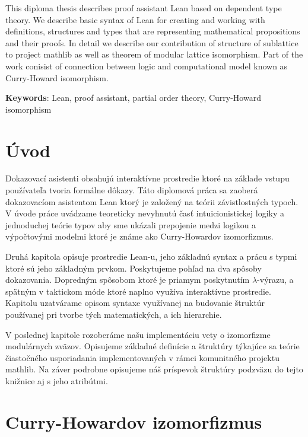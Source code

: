 \documentclass[a4paper,10pt,oneside]{report}%
\begin{document}
    This diploma thesis describes proof assistant Lean based on dependent type theory.
    We describe basic syntax of Lean for creating and working with definitions, structures and
types that are representing mathematical propositions and their proofs.
    In detail we describe our contribution of structure of sublattice to project mathlib
as well as theorem of modular lattice isomorphism.
    Part of the work conisist of connection between logic and computational model
known as Curry-Howard isomorphism.
    
    \textbf{Keywords}: Lean, proof assistant, partial order theory, Curry-Howard isomorphism

\newpage

\tableofcontents

\newpage

\chapter{Úvod}
    Dokazovací asistenti obsahujú interaktívne prostredie ktoré na základe vstupu
používateľa tvoria formálne dôkazy.
    Táto diplomová práca sa zaoberá dokazovacíom asistentom Lean ktorý je
založený na teórii závistlostných typoch.
    V úvode práce uvádzame teoreticky nevyhnutú časť intuicionistickej logiky
a jednoduchej teórie typov aby sme ukázali prepojenie medzi logikou a výpočtovými
modelmi ktoré je známe ako Curry-Howardov izomorfizmus.

    Druhá kapitola opisuje prostredie Lean-u, jeho základnú syntax a prácu s 
typmi ktoré sú jeho základným prvkom.
    Poskytujeme pohľad na dva spôsoby dokazovania. Dopredným spôsobom ktoré je priamym
poskytnutím $\lambda$-výrazu, a spätným v taktickom móde ktoré naplno využíva interaktívne prostredie.
    Kapitolu uzatvárame opisom syntaxe využívanej na budovanie štruktúr používanej
pri tvorbe tých matematických, a ich hierarchie.

    V poslednej kapitole rozoberáme našu implementáciu vety o izomorfizme modulárnych
zväzov.
    Opisujeme základné definície a štruktúry týkajúce sa teórie čiastočného usporiadania
implementovaných v rámci komunitného projektu mathlib.
    Na záver podrobne opisujeme náš príspevok štruktúry podzväzu do tejto knižnice aj s jeho atribútmi.

\chapter{Curry-Howardov izomorfizmus}
\end{document}
